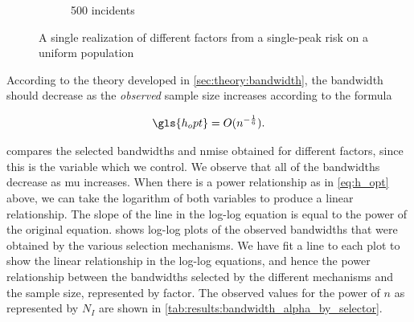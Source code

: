 \begin{figure}[htbp]
\begin{subfigure}{0.45\textwidth}
        \caption{500 incidents}
    \end{subfigure}
        \caption{A single realization of different \glspl{factor} from a single-peak risk on a uniform population}
        \label{fig:one_sample:unif_NCases_1h}
\end{figure}

According to the theory developed in \cref{sec:theory:bandwidth},
the bandwidth should decrease as the \textit{observed} sample size increases according to the formula

\begin{equation}
    \label{eq:h_opt}
    \gls{h_opt} = O(n^{-\frac{1}{6}}) \text{.}
\end{equation}

 compares the selected bandwidths and \gls{nmise} obtained for different \glspl{factor},
since this is the variable which we control.
We observe that all of the bandwidths decrease as \gls{mu} increases.
When there is a power relationship as in \cref{eq:h_opt} above, we can take the logarithm of both variables to produce a linear relationship.
The slope of the line in the log-log equation is equal to the power of the original equation.
 shows log-log plots of the observed bandwidths that were obtained by the various selection mechanisms.
We have fit a line to each plot to show the linear relationship in the log-log equations, and hence the power relationship between the bandwidths selected by the different mechanisms and the sample size, represented by \gls{factor}.
The observed values for the power of $n$ as represented by $N_I$ are shown in \cref{tab:results:bandwidth_alpha_by_selector}.





